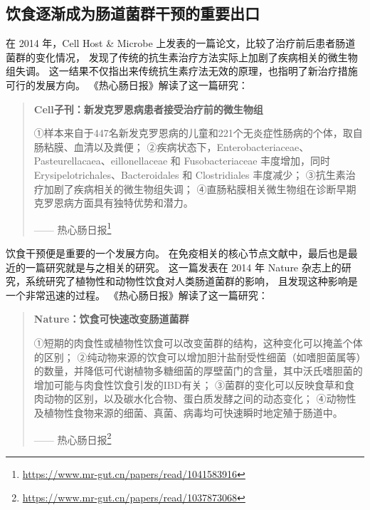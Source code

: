 \documentclass[]{ctexbook}
\renewcommand{\href}[2]{#2\footnote{\url{#1}}}
\begin{document}
\hypertarget{ux996eux98dfux9010ux6e10ux6210ux4e3aux80a0ux9053ux83ccux7fa4ux5e72ux9884ux7684ux91cdux8981ux51faux53e3}{%
\subsection{饮食逐渐成为肠道菌群干预的重要出口}\label{ux996eux98dfux9010ux6e10ux6210ux4e3aux80a0ux9053ux83ccux7fa4ux5e72ux9884ux7684ux91cdux8981ux51faux53e3}}

在 2014 年，Cell Host \& Microbe 上发表的一篇论文，比较了治疗前后患者肠道菌群的变化情况，
发现了传统的抗生素治疗方法实际上加剧了疾病相关的微生物组失调\citep{geversTreatmentNaiveMicrobiomeNewOnset2014}。
这一结果不仅指出来传统抗生素疗法无效的原理，也指明了新治疗措施可行的发展方向。
《热心肠日报》解读了这一篇研究：

\begin{quote}
\textbf{Cell子刊：新发克罗恩病患者接受治疗前的微生物组}

①样本来自于447名新发克罗恩病的儿童和221个无炎症性肠病的个体，取自肠粘膜、血清以及粪便；
②疾病状态下，Enterobacteriaceae、Pasteurellacaea、eillonellaceae 和 Fusobacteriaceae 丰度增加，同时 Erysipelotrichales、Bacteroidales 和 Clostridiales 丰度减少；
③抗生素治疗加剧了疾病相关的微生物组失调；
④直肠粘膜相关微生物组在诊断早期克罗恩病方面具有独特优势和潜力。

\begin{flushright}------ \href{https://www.mr-gut.cn/papers/read/1041583916}{热心肠日报}\end{flushright}
\end{quote}

饮食干预便是重要的一个发展方向。
在免疫相关的核心节点文献中，最后也是最近的一篇研究就是与之相关的研究。
这一篇发表在 2014 年 Nature 杂志上的研究，系统研究了植物性和动物性饮食对人类肠道菌群的影响，
且发现这种影响是一个非常迅速的过程。
《热心肠日报》解读了这一篇研究：

\begin{quote}
\textbf{Nature：饮食可快速改变肠道菌群}

①短期的肉食性或植物性饮食可以改变菌群的结构，这种变化可以掩盖个体的区别；
②纯动物来源的饮食可以增加胆汁盐耐受性细菌（如嗜胆菌属等）的数量，并降低可代谢植物多糖细菌的厚壁菌门的含量，其中沃氏嗜胆菌的增加可能与肉食性饮食引发的IBD有关；
③菌群的变化可以反映食草和食肉动物的区别，以及碳水化合物、蛋白质发酵之间的动态变化；
④动物性及植物性食物来源的细菌、真菌、病毒均可快速瞬时地定殖于肠道中。

\begin{flushright}------ \href{https://www.mr-gut.cn/papers/read/1037873068}{热心肠日报}\end{flushright}
\end{quote}
\end{document}
